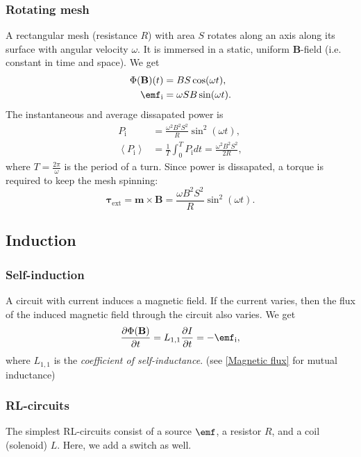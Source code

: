 \documentclass[a4paper, 12pt]{article}
\renewcommand{\vec}[1]{\mathbf{#1}}
\newcommand{\B}{\ensuremath{\vec{B}}}
\begin{document}
        \subsubsection{Rotating mesh}
            A rectangular mesh (resistance $R$) with area $S$ rotates along an axis along its surface with angular velocity $\omega$. 
            It is immersed in a static, uniform \B-field (i.e. constant in time and space).
            We get 
            \begin{align}
                \Phi(\B)(t) &= BS\cos (\omega t), \\
                \emf_\text{i} &= \omega S B \sin (\omega t).
            \end{align}
            The instantaneous and average dissapated power is 
            \begin{align}
                P_\text{i} &= \frac{\omega^2 B^2 S^2}{R}\sin^2(\omega t),\\
                \left<P_\text{i}\right> &= \frac{1}{T}\int_0^T P_\text{i}dt = \frac{\omega^2 B^2 S^2}{2R},
            \end{align}
            where $T = \frac{2\pi}{\omega}$ is the period of a turn.
            Since power is dissapated, a torque is required to keep the mesh spinning: 
            \begin{equation}
                \vec{\tau}_\text{ext} = \vec{m}\times\B = \frac{\omega B^2 S^2}{R}\sin^2(\omega t).
            \end{equation}
        
    \subsection{Induction}
        \subsubsection{Self-induction}
            A circuit with current induces a magnetic field. 
            If the current varies, then the flux of the induced magnetic field through the circuit also varies. 
            We get
            \begin{equation}
                \frac{\partial \Phi(\B)}{\partial t} = L_{1,1}\frac{\partial I}{\partial t} = -\emf_{\text{i}},
            \end{equation}
            where $L_{1,1}$ is the \textit{coefficient of self-inductance}. (see \ref{Magnetic flux} for mutual inductance)
            
        \subsubsection{RL-circuits}
            The simplest RL-circuits consist of a source $\emf$, a resistor $R$, and a coil (solenoid) $L$.
            Here, we add a switch as well.
\end{document}
